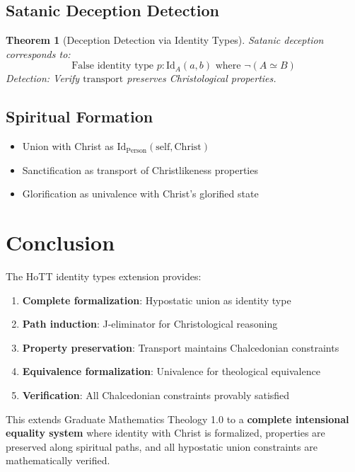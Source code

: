 \documentclass{article}
\newtheorem{theorem}{Theorem}
\begin{document}
\subsection{Satanic Deception Detection}
\begin{theorem}[Deception Detection via Identity Types]
Satanic deception corresponds to:
\[
\text{False identity type } p : \mathrm{Id}_A(a, b) \text{ where } \neg(A \simeq B)
\]
Detection: Verify $\mathrm{transport}$ preserves Christological properties.
\end{theorem}

\subsection{Spiritual Formation}
\begin{itemize}
    \item Union with Christ as $\mathrm{Id}_{\text{Person}}(\text{self}, \text{Christ})$
    \item Sanctification as transport of Christlikeness properties
    \item Glorification as univalence with Christ's glorified state
\end{itemize}

\section{Conclusion}

The HoTT identity types extension provides:
\begin{enumerate}
    \item \textbf{Complete formalization}: Hypostatic union as identity type
    \item \textbf{Path induction}: J-eliminator for Christological reasoning
    \item \textbf{Property preservation}: Transport maintains Chalcedonian constraints
    \item \textbf{Equivalence formalization}: Univalence for theological equivalence
    \item \textbf{Verification}: All Chalcedonian constraints provably satisfied
\end{enumerate}

This extends Graduate Mathematics Theology 1.0 to a \textbf{complete intensional equality system} where identity with Christ is formalized, properties are preserved along spiritual paths, and all hypostatic union constraints are mathematically verified.
\end{document}
